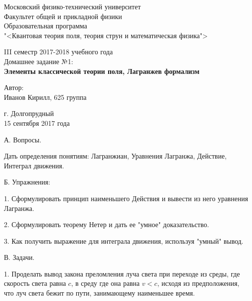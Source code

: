 \documentclass[12pt]{kiarticle}
\begin{document}
\begin{titlepage}		
	\begin{center}
		\large 	Московский физико-технический университет \\
		Факультет общей и прикладной физики \\
		\vspace{0.2cm}
		Образовательная программа\\
		"<Квантовая теория поля, теория струн и математическая физика">
		
		\vspace{4.5cm}
		III семестр 2017-2018 учебного года \\ \vspace{0.1cm}
		\large Домашнее задание №1: \\ \vspace{0.1cm}
		\LARGE \textbf{Элементы классической теории поля, Лагранжев формализм}
	\end{center}
	\vspace{2.3cm} \large
	
	\begin{center}
		Автор: \\
		Иванов Кирилл,
		625 группа
		\vspace{10mm}
		
		
	\end{center}
	
	\begin{center} \vspace{50mm}
		г. Долгопрудный \\ 
		15 сентября 2017 года
	\end{center}
\end{titlepage}


А. Вопросы.

Дать определения понятиям:
Лагранжиан, Уравнения Лагранжа, 
Действие, Интеграл движения.


Б. Упражнения:

1. Сформулировать принцип наименьшего Действия  и 
вывести из него  уравнения Лагранжа.

2. Сформулировать теорему Нетер и дать ее "умное" доказательство.

3. Как получить выражение для интеграла движения, используя "умный" вывод.


В. Задачи.

1. Проделать вывод закона преломления луча света при переходе из среды,
где скорость света равна $c$, в среду где она равна $v<c$, исходя из предположения,
что луч света бежит по пути, занимающему наименьшее время.
\end{document}
